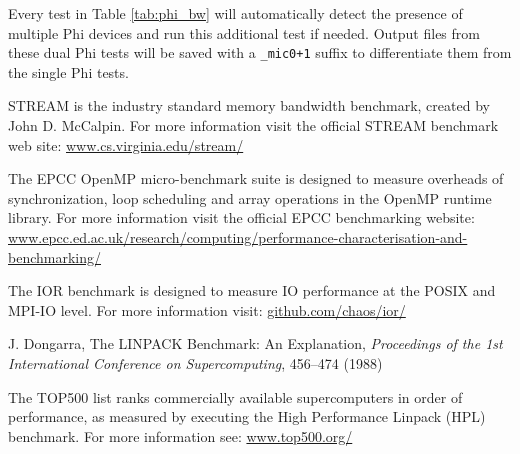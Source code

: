 \documentclass[10pt,a4paper]{report}
\begin{document}
Every test in Table \ref{tab:phi_bw} will automatically detect the presence of multiple Phi devices and run this additional test if needed. Output files from these dual Phi tests will be saved with a \verb|_mic0+1| suffix to differentiate them from the single Phi tests. 

\FloatBarrier
{}
\begin{thebibliography}{00}

STREAM is the industry standard memory bandwidth benchmark, created by John D. McCalpin.  For more information visit the official STREAM benchmark web site: \href{http://www.cs.virginia.edu/stream/}{www.cs.virginia.edu/stream/}

 The EPCC OpenMP micro-benchmark suite is designed to measure overheads of synchronization, loop scheduling and array operations in the OpenMP runtime library. For more information visit the official EPCC benchmarking website:  \href{http://www.epcc.ed.ac.uk/research/computing/performance-characterisation-and-benchmarking/}{\small www.epcc.ed.ac.uk/research/computing/performance-characterisation-and-benchmarking/}

 The IOR benchmark is designed to measure IO performance at the  POSIX and MPI-IO level. For more information visit: \href{http://github.com/chaos/ior/}{github.com/chaos/ior/}

 J. Dongarra, The LINPACK Benchmark: An Explanation, \textit{Proceedings of the 1st International Conference on Supercomputing}, 456--474 (1988)

 The TOP500 list ranks commercially available supercomputers in order of performance, as measured by executing the High Performance Linpack (HPL) benchmark. For more information see: \href{http://www.top500.org/}{www.top500.org/}

\end{thebibliography}
\end{document}
